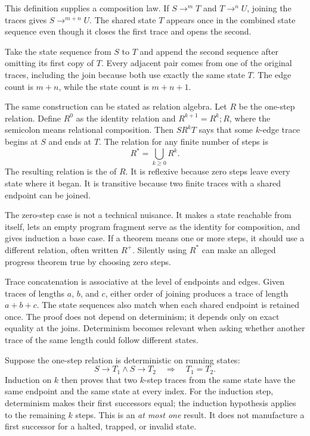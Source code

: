 This definition supplies a composition law. If
\(S\mathrel{\to^{m}}T\) and \(T\mathrel{\to^{n}}U\), joining the
traces gives \(S\mathrel{\to^{m+n}}U\). The shared state \(T\) appears
once in the combined state sequence even though it closes the first trace and
opens the second.

\begin{proofkit}[title={Concatenating execution traces}]
Take the state sequence from \(S\) to \(T\) and append the second sequence
after omitting its first copy of \(T\). Every adjacent pair comes from one
of the original traces, including the join because both use exactly the same
state \(T\). The edge count is \(m+n\), while the state count is
\(m+n+1\).
\end{proofkit}

The same construction can be stated as relation algebra. Let \(R\) be the
one-step relation. Define \(R^0\) as the identity relation and
\(R^{k+1}=R^k;R\), where the semicolon means relational composition. Then
\(S\mathrel{R^k}T\) says that some \(k\)-edge trace begins at \(S\) and ends
at \(T\). The relation for any finite number of steps is
\[
 R^* = \bigcup_{k\geq 0}R^k.
\]
The resulting relation is the  of \(R\).
It is reflexive
because zero steps leave every state where it began. It is transitive because
two finite traces with a shared endpoint can be joined.

The zero-step case is not a technical nuisance. It makes a state reachable
from itself, lets an empty program fragment serve as the identity for
composition, and gives induction a base case. If a theorem means one or more
steps, it should use a different relation, often written \(R^+\). Silently
using \(R^*\) can make an alleged progress theorem true by choosing zero
steps.

Trace concatenation is associative at the level of endpoints and edges. Given
traces of lengths \(a\), \(b\), and \(c\), either order of joining produces a
trace of length \(a+b+c\). The state sequences also match when each shared
endpoint is retained once. The proof does not depend on determinism; it
depends only on exact equality at the joins. Determinism becomes relevant
when asking whether another trace of the same length could follow different
states.

Suppose the one-step relation is deterministic on running states:
\[
 S\to T_1 \mathrel{\land} S\to T_2 \quad\Longrightarrow\quad T_1=T_2.
\]
Induction on \(k\) then proves that two \(k\)-step traces from the same state
have the same endpoint and the same state at every index. For the induction
step, determinism makes their first successors equal; the induction
hypothesis applies to the remaining \(k\) steps. This is an \emph{at most
one} result. It does not manufacture a first successor for a halted, trapped,
or invalid state.

